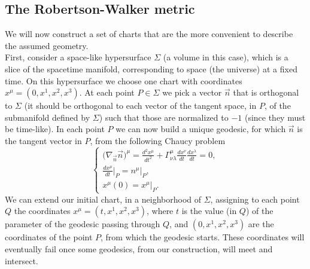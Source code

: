 \subsection{The Robertson-Walker metric}
We will now construct a set of charts that are the more convenient to describe the assumed geometry.\\
First, consider a space-like hypersurface $\Sigma$ (a volume in this case), which is a slice of the spacetime manifold, corresponding to space (the universe) at a fixed time. On this hypersurface we choose one chart with coordinates $x^\mu=(0,x^1,x^2,x^3)$. At each point $P\in\Sigma$ we pick a vector $\vec n$ that is orthogonal to $\Sigma$ (it should be orthogonal to each vector of the tangent space, in $P$, of the submanifold defined by $\Sigma$) such that those are normalized to $-1$ (since they must be time-like). In each point $P$ we can now build a unique geodesic, for which $\vec n$ is the tangent vector in $P$, from the following Chaucy problem
\begin{equation}\label{Chaucy problem}
    \begin{cases}
        \big(\nabla_{\vec n}\vec n\big)^\mu=\frac{d^2x^\mu}{dt^2}+\Gamma_{\nu\lambda}^{\mu}\frac{dx^\nu}{dt}\frac{dx^\lambda}{dt}=0,\\\frac{dx^\mu}{dt}\big|_{P}=n^\mu\big|_P,\\x^\mu(0)=x^\mu\big|_P.
    \end{cases}
\end{equation}
We can extend our initial chart, in a neighborhood of $\Sigma$, assigning to each point $Q$ the coordinates $x^\mu=(t,x^1,x^2,x^3)$, where $t$ is the value (in $Q$) of the parameter of the geodesic passing through $Q$, and $(0,x^1,x^2,x^3)$ are the coordinates of the point $P$, from which the geodesic starts. These coordinates will eventually fail once some geodesics, from our construction, will meet and intersect.\\

